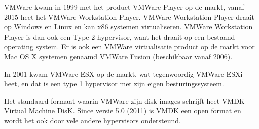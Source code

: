 VMWare kwam in 1999 met het product VMWare Player op de markt, vanaf 2015 heet het VMWare Workstation Player. VMWare Workstation Player draait op Windows en Linux en kan x86 systemen virtualiseren. VMWare Workstation Player is dan ook een Type 2 hypervisor, want het draait op een bestaand operating system. Er is ook een VMWare virtualisatie product op de markt voor Mac OS X systemen genaamd VMWare Fusion (beschikbaar vanaf 2006).

In 2001 kwam VMWare ESX op de markt, wat tegenwoordig VMWare ESXi heet, en dat is een type 1 hypervisor met zijn eigen besturingssysteem.

Het standaard formaat waarin VMWare zijn disk images schrijft heet VMDK - Virtual Machine DisK. Since versie 5.0 (2011) is VMDK een open format en wordt het ook door vele andere hypervisors ondersteund.
